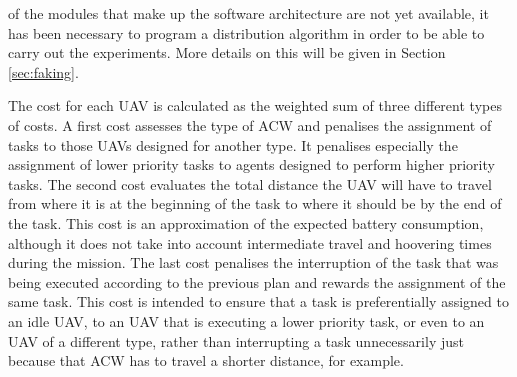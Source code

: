 of the modules that make up the software architecture are not yet available, it has been necessary to program a distribution algorithm in order to be able to carry out the experiments. More details on this will be given in Section \ref{sec:faking}.

The cost for each \gls{UAV} is calculated as the weighted sum of three different types of costs. A first cost assesses the type of \gls{ACW} and penalises the assignment of tasks to those \glspl{UAV} designed for another type. It penalises especially the assignment of lower priority tasks to agents designed to perform higher priority tasks. The second cost evaluates the total distance the \gls{UAV} will have to travel from where it is at the beginning of the task to where it should be by the end of the task. This cost is an approximation of the expected battery consumption, although it does not take into account intermediate travel and hoovering times during the mission. The last cost penalises the interruption of the task that was being executed according to the previous plan and rewards the assignment of the same task. This cost is intended to ensure that a task is preferentially assigned to an idle \gls{UAV}, to an \gls{UAV} that is executing a lower priority task, or even to an \gls{UAV} of a different type, rather than interrupting a task unnecessarily just because that \gls{ACW} has to travel a shorter distance, for example.

